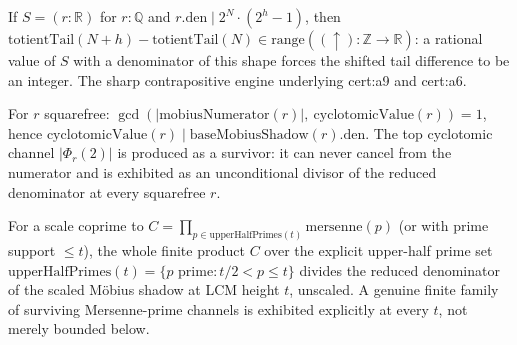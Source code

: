 \begin{prop}
If $S = (r:\mathbb{R})$ for $r:\mathbb{Q}$ and $r.\mathrm{den} \mid 2^N\cdot(2^h-1)$, then $\mathrm{totientTail}(N+h) - \mathrm{totientTail}(N) \in \mathrm{range}((\uparrow):\mathbb{Z}\to\mathbb{R})$: a rational value of $S$ with a denominator of this shape forces the shifted tail difference to be an integer. The sharp contrapositive engine underlying cert:a9 and cert:a6.
\par\noindent{}   
\end{prop}

\begin{prop}
For $r$ squarefree: $\gcd(|\mathrm{mobiusNumerator}(r)|,\ \mathrm{cyclotomicValue}(r)) = 1$, hence $\mathrm{cyclotomicValue}(r) \mid \mathrm{baseMobiusShadow}(r).\mathrm{den}$. The top cyclotomic channel $|\Phi_r(2)|$ is produced as a survivor: it can never cancel from the numerator and is exhibited as an unconditional divisor of the reduced denominator at every squarefree $r$.
\par\noindent{}    
\end{prop}

\begin{prop}
For a scale coprime to $C = \prod_{p \in \mathrm{upperHalfPrimes}(t)} \mathrm{mersenne}(p)$ (or with prime support $\le t$), the whole finite product $C$ over the explicit upper-half prime set $\mathrm{upperHalfPrimes}(t) = \{p \text{ prime} : t/2 < p \le t\}$ divides the reduced denominator of the scaled M\"obius shadow at LCM height $t$, unscaled. A genuine finite family of surviving Mersenne-prime channels is exhibited explicitly at every $t$, not merely bounded below.
\par\noindent{}     
\end{prop}

